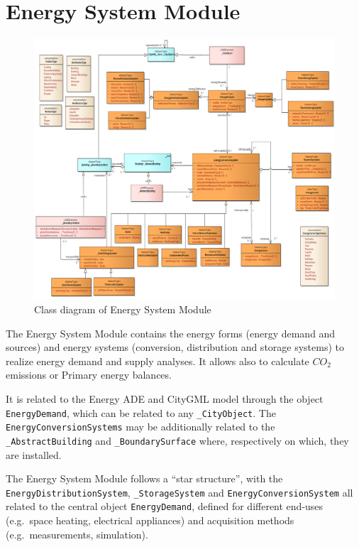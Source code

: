 \documentclass[a4paper,12pt]{article}
\let\stdsection\section%
\renewcommand\section{\newpage\stdsection}
\begin{document}
\section{Energy System Module}\label{energy-system-module}

\begin{figure}[htbp]
\centering
\includegraphics{fig/class_EnergySystem.png}
\caption{Class diagram of Energy System Module}
\end{figure}

The Energy System Module contains the energy forms (energy demand and
sources) and energy systems (conversion, distribution and storage
systems) to realize energy demand and supply analyses. It allows also to
calculate \(CO_2\) emissions or Primary energy balances.

It is related to the Energy ADE and CityGML model through the object
\lstinline!EnergyDemand!, which can be related to any
\lstinline!_CityObject!. The \lstinline!EnergyConversionSystems! may be
additionally related to the \lstinline!_AbstractBuilding! and
\lstinline!_BoundarySurface! where, respectively on which, they are
installed.

The Energy System Module follows a ``star structure'', with the
\lstinline!EnergyDistributionSystem!, \lstinline!_StorageSystem! and
\lstinline!EnergyConversionSystem! all related to the central object
\lstinline!EnergyDemand!, defined for different end-uses (e.g.~space
heating, electrical appliances) and acquisition methods
(e.g.~measurements, simulation).
\end{document}
